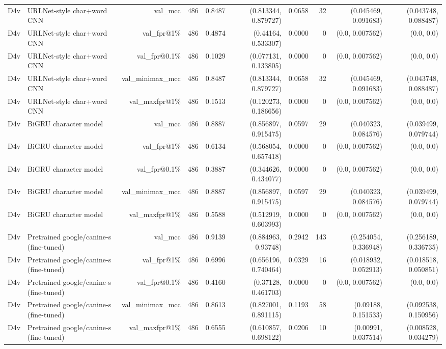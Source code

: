\begin{table}[t]
\begin{tabular}{llrrrrrrrr}
D4v & URLNet-style char+word CNN & val\_mcc & 486 & 0.8487 & (0.813344, 0.879727) & 0.0658 & 32 & (0.045469, 0.091683) & (0.043748, 0.088487) \\
D4v & URLNet-style char+word CNN & val\_fpr@1\% & 486 & 0.4874 & (0.44164, 0.533307) & 0.0000 & 0 & (0.0, 0.007562) & (0.0, 0.0) \\
D4v & URLNet-style char+word CNN & val\_fpr@0.1\% & 486 & 0.1029 & (0.077131, 0.133805) & 0.0000 & 0 & (0.0, 0.007562) & (0.0, 0.0) \\
D4v & URLNet-style char+word CNN & val\_minimax\_mcc & 486 & 0.8487 & (0.813344, 0.879727) & 0.0658 & 32 & (0.045469, 0.091683) & (0.043748, 0.088487) \\
D4v & URLNet-style char+word CNN & val\_maxfpr@1\% & 486 & 0.1513 & (0.120273, 0.186656) & 0.0000 & 0 & (0.0, 0.007562) & (0.0, 0.0) \\
D4v & BiGRU character model & val\_mcc & 486 & 0.8887 & (0.856897, 0.915475) & 0.0597 & 29 & (0.040323, 0.084576) & (0.039499, 0.079744) \\
D4v & BiGRU character model & val\_fpr@1\% & 486 & 0.6134 & (0.568054, 0.657418) & 0.0000 & 0 & (0.0, 0.007562) & (0.0, 0.0) \\
D4v & BiGRU character model & val\_fpr@0.1\% & 486 & 0.3887 & (0.344626, 0.434077) & 0.0000 & 0 & (0.0, 0.007562) & (0.0, 0.0) \\
D4v & BiGRU character model & val\_minimax\_mcc & 486 & 0.8887 & (0.856897, 0.915475) & 0.0597 & 29 & (0.040323, 0.084576) & (0.039499, 0.079744) \\
D4v & BiGRU character model & val\_maxfpr@1\% & 486 & 0.5588 & (0.512919, 0.603993) & 0.0000 & 0 & (0.0, 0.007562) & (0.0, 0.0) \\
D4v & Pretrained google/canine-s (fine-tuned) & val\_mcc & 486 & 0.9139 & (0.884963, 0.93748) & 0.2942 & 143 & (0.254054, 0.336948) & (0.256189, 0.336735) \\
D4v & Pretrained google/canine-s (fine-tuned) & val\_fpr@1\% & 486 & 0.6996 & (0.656196, 0.740464) & 0.0329 & 16 & (0.018932, 0.052913) & (0.018518, 0.050851) \\
D4v & Pretrained google/canine-s (fine-tuned) & val\_fpr@0.1\% & 486 & 0.4160 & (0.37128, 0.461703) & 0.0000 & 0 & (0.0, 0.007562) & (0.0, 0.0) \\
D4v & Pretrained google/canine-s (fine-tuned) & val\_minimax\_mcc & 486 & 0.8613 & (0.827001, 0.891115) & 0.1193 & 58 & (0.09188, 0.151533) & (0.092538, 0.150956) \\
D4v & Pretrained google/canine-s (fine-tuned) & val\_maxfpr@1\% & 486 & 0.6555 & (0.610857, 0.698122) & 0.0206 & 10 & (0.00991, 0.037514) & (0.008528, 0.034279) \\

\end{tabular}
\end{table}
